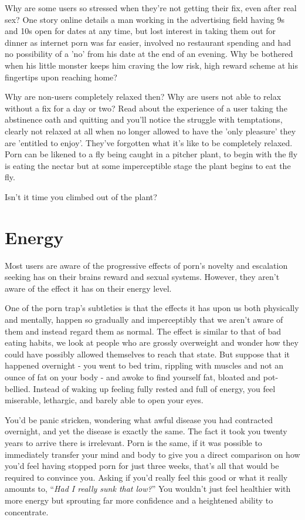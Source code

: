 \documentclass[
]{book}
\begin{document}
Why are some users so stressed when they're not getting their fix, even after real sex? One story online details a man working in the advertising field having 9s and 10s open for dates at any time, but lost interest in taking them out for dinner as internet porn was far easier, involved no restaurant spending and had no possibility of a 'no' from his date at the end of an evening. Why be bothered when his little monster keeps him craving the low risk, high reward scheme at his fingertips upon reaching home?

Why are non-users completely relaxed then? Why are users not able to relax without a fix for a day or two? Read about the experience of a user taking the abstinence oath and quitting and you'll notice the struggle with temptations, clearly not relaxed at all when no longer allowed to have the 'only pleasure' they are 'entitled to enjoy'. They've forgotten what it's like to be completely relaxed. Porn can be likened to a fly being caught in a pitcher plant, to begin with the fly is eating the nectar but at some imperceptible stage the plant begins to eat the fly.

Isn't it time you climbed out of the plant?

\hypertarget{energy}{%
\section{Energy}\label{energy}}

Most users are aware of the progressive effects of porn's novelty and escalation seeking has on their brains reward and sexual systems. However, they aren't aware of the effect it has on their energy level.

One of the porn trap's subtleties is that the effects it has upon us both physically and mentally, happen so gradually and imperceptibly that we aren't aware of them and instead regard them as normal. The effect is similar to that of bad eating habits, we look at people who are grossly overweight and wonder how they could have possibly allowed themselves to reach that state. But suppose that it happened overnight - you went to bed trim, rippling with muscles and not an ounce of fat on your body - and awoke to find yourself fat, bloated and pot-bellied. Instead of waking up feeling fully rested and full of energy, you feel miserable, lethargic, and barely able to open your eyes.

You'd be panic stricken, wondering what awful disease you had contracted overnight, and yet the disease is exactly the same. The fact it took you twenty years to arrive there is irrelevant. Porn is the same, if it was possible to immediately transfer your mind and body to give you a direct comparison on how you'd feel having stopped porn for just three weeks, that's all that would be required to convince you. Asking if you'd really feel this good or what it really amounts to, ``\emph{Had I really sunk that low?}'' You wouldn't just feel healthier with more energy but sprouting far more confidence and a heightened ability to concentrate.
\end{document}
